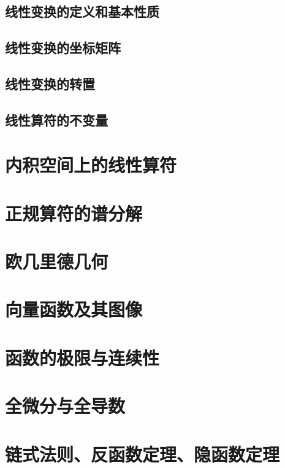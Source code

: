 \documentclass[zihao=-4,linespread=1.5,heading=true,a4paper,twoside]{ctexart}
\begin{document}
\subsection{线性变换的定义和基本性质}\label{sec:II.4.1}

\subsection{线性变换的坐标矩阵}\label{sec:II.4.2}

\subsection{线性变换的转置}\label{sec:II.4.3}

\subsection{线性算符的不变量}


\section{内积空间上的线性算符}\label{sec:II.6}


\section{正规算符的谱分解}\label{sec:II.7}
%

\section{欧几里德几何}


\section{向量函数及其图像}


\section{函数的极限与连续性}


\section{全微分与全导数}


\section{链式法则、反函数定理、隐函数定理}

\end{document}
